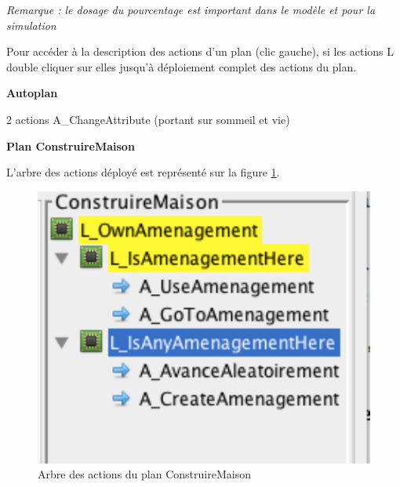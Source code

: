 \textit{Remarque : le dosage du pourcentage est important dans le modèle et pour la simulation}

Pour accéder à la description des actions d'un plan (clic gauche), si les actions L double cliquer sur elles jusqu'à déploiement complet des actions du plan.


\begin{flushleft}
\textbf{Autoplan}
\end{flushleft}

	2 actions A\_ChangeAttribute (portant sur sommeil et vie)
	
	
\begin{flushleft}
\textbf{Plan ConstruireMaison}
\end{flushleft}

L'arbre des actions déployé est représenté sur la figure \ref{PL}.
\begin{figure}[!ht]
\begin{center}
\includegraphics[scale=0.5]{DocumentationSimulation/planex.pdf}
\caption[PL]{Arbre des actions du plan ConstruireMaison \\}
\label{PL}
\end{center}
\end{figure} 

